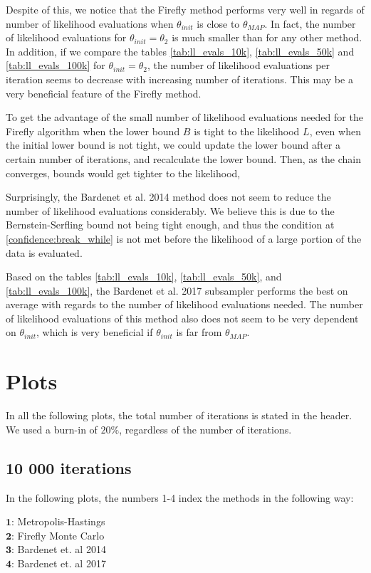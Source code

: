 Despite of this, we notice that the Firefly method performs very well in regards of number of likelihood evaluations when $\theta_{init}$ is close to $\theta_{MAP}$. In fact, the number of likelihood evaluations for $\theta_{init} = \theta_2$ is much smaller than for any other method. In addition, if we compare the tables \ref{tab:ll_evals_10k}, \ref{tab:ll_evals_50k} and \ref{tab:ll_evals_100k} for $\theta_{init} = \theta_2$, the number of likelihood evaluations per iteration seems to decrease with increasing number of iterations. This may be a very beneficial feature of the Firefly method. 

To get the advantage of the small number of likelihood evaluations needed for the Firefly algorithm when the lower bound $B$ is tight to the likelihood $L$, even when the initial lower bound is not tight, we could update the lower bound after a certain number of iterations, and recalculate the lower bound. Then, as the chain converges, bounds would get tighter to the likelihood,   

Surprisingly, the Bardenet et al. 2014 method does not seem to reduce the number of likelihood evaluations considerably. We believe this is due to the Bernstein-Serfling bound not being tight enough, and thus the condition at \ref{confidence:break_while} is not met before the likelihood of a large portion of the data is evaluated. 






Based on the tables \ref{tab:ll_evals_10k}, \ref{tab:ll_evals_50k}, and \ref{tab:ll_evals_100k}, the Bardenet et al. 2017 subsampler performs the best on average with regards to the number of likelihood evaluations needed. The number of likelihood evaluations of this method also does not seem to be very dependent on $\theta_{init}$, which is very beneficial if $\theta_{init}$ is far from $\theta_{MAP}$. 



\section{Plots}
In all the following plots, the total number of iterations is stated in the header. We used a burn-in of $20\%$, regardless of the number of iterations. 
\subsection{10 000 iterations}
In the following plots, the numbers 1-4 index the methods in the following way: \\
\begin{centering}
$\mathbf{1}$:  Metropolis-Hastings \\
$\mathbf{2}$: Firefly Monte Carlo  \\
$\mathbf{3}$: Bardenet et. al 2014 \\
$\mathbf{4}$: Bardenet et. al 2017 \\
\end{centering}


